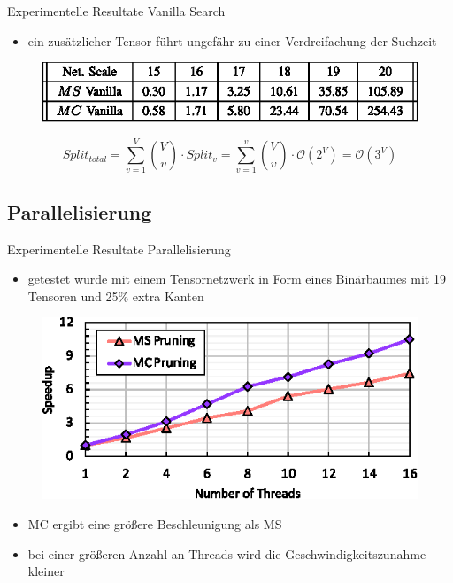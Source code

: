 \documentclass{beamer}
\begin{document}
		\begin{frame}{Experimentelle Resultate Vanilla Search}
			\begin{itemize}
				\item ein zusätzlicher Tensor führt ungefähr zu einer Verdreifachung der Suchzeit
			\end{itemize}
			\begin{figure}
				\includegraphics{table_02}
			\end{figure}
			\begin{equation*}
				Split_{total} = \sum^V_{v=1} \binom{V}{v} \cdot Split_v = \sum^v_{v=1} \binom{V}{v} \cdot \mathcal{O} \left(2^V \right) = \mathcal{O} \left(3^V \right)
			\end{equation*}
		\end{frame}

	\subsection{Parallelisierung}

		\begin{frame}{Experimentelle Resultate Parallelisierung}
			\begin{itemize}
				\item getestet wurde mit einem Tensornetzwerk in Form eines Binärbaumes mit 19 Tensoren und 25\% extra Kanten
			\end{itemize}
			\begin{figure}
				\includegraphics{figure_13}
			\end{figure} \pause
			\begin{itemize}
				\item MC ergibt eine größere Beschleunigung als MS
				\item bei einer größeren Anzahl an Threads wird die Geschwindigkeitszunahme kleiner
			\end{itemize}
		\end{frame}
\end{document}

